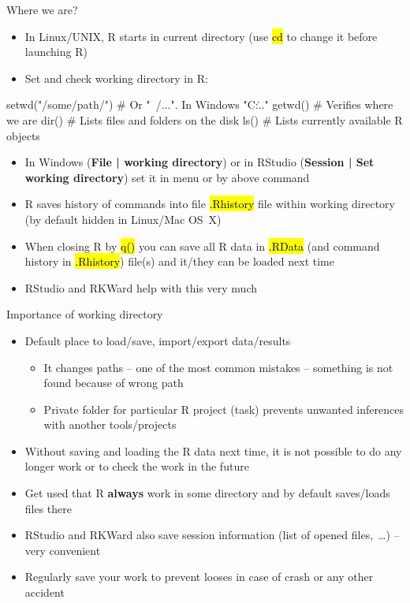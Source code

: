 \documentclass[compress, ucs, xelatex, 11pt, xcolor=svgnames,
  hyperref={
    bookmarks=true,
    unicode=true,
    colorlinks=true,
    pdftitle={Molecular data in R},
    plainpages=false,
    pdfauthor={Vojtech Zeisek},
    pdfsubject={Course about phylogeny and evolution in R},
    pdfcreator={XeLaTeX},
    pdfkeywords={R, evolution, phylogeny, molecular data},
    linkcolor=Tomato,
    anchorcolor=SaddleBrown,
    citecolor=Goldenrod,
    filecolor=DarkMagenta,
    menucolor=Sienna,
    urlcolor=DarkTurquoise,
    pdftex},
  url={hyphens, lowtilde} %
  ]{beamer}
\renewcommand{\texttt}[1]{\hl{\ttfamily #1}}
\begin{document}
\begin{frame}[fragile]{Where we are?}
\begin{itemize}
 \item In Linux/UNIX, R starts in current directory (use \texttt{cd} to change it before launching R)
 \item \alert{Set and check working directory} in R:
\end{itemize}
  \begin{spluscode}
    setwd("/some/path/") # Or "~/...". In Windows "C:\..."
    getwd() # Verifies where we are
    dir() # Lists files and folders on the disk
    ls() # Lists currently available R objects
  \end{spluscode}
\begin{itemize}
 \item In Windows (\textbf{File | working directory}) or in RStudio (\textbf{Session | Set working directory}) set it in menu or by above command
 \item R saves history of commands into file \texttt{.Rhistory} file within working directory (by default hidden in Linux/Mac OS~X)
 \item When closing R by \texttt{q()} you can save all R data in \texttt{.RData} (and command history in \texttt{.Rhistory}) file(s) and it/they can be loaded next time
 \item RStudio and RKWard help with this very much
\end{itemize}
\end{frame}

\begin{frame}{Importance of working directory}
  \begin{itemize}
    \item Default place to load/save, import/export data/results
    \begin{itemize}
      \item It changes paths -- one of the most common mistakes -- something is not found because of wrong path
      \item Private folder for particular R project (task) prevents unwanted inferences with another tools/projects
    \end{itemize}
    \item Without saving and loading the R data next time, it is not possible to do any longer work or to check the work in the future
    \item Get used that R \textbf{always} work in some directory and by default saves/loads files there
    \item RStudio and RKWard also save session information (list of opened files,~\ldots) -- very convenient
    \item Regularly save your work to prevent looses in case of crash or any other accident
  \end{itemize}
\end{frame}
\end{document}
